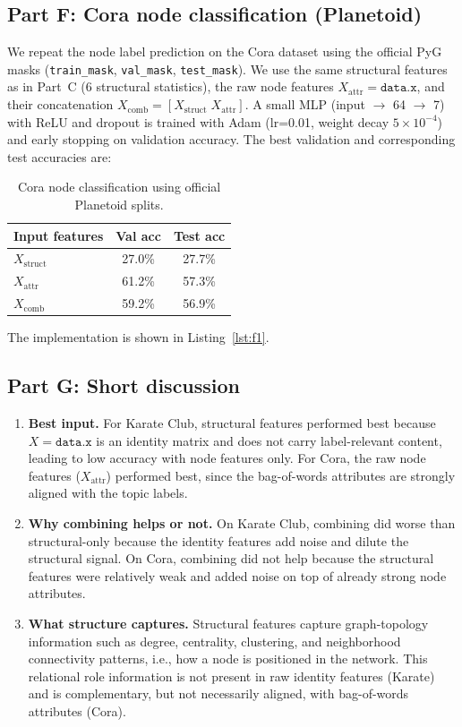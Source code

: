 \documentclass{article}
\begin{document}
\subsection{Part F: Cora node classification (Planetoid)}
We repeat the node label prediction on the Cora dataset using the official PyG masks (\texttt{train\_mask}, \texttt{val\_mask}, \texttt{test\_mask}). We use the same structural features as in Part~C (6 structural statistics), the raw node features $X_{\text{attr}}=\texttt{data.x}$, and their concatenation $X_{\text{comb}}=[X_{\text{struct}} \; X_{\text{attr}}]$. A small MLP (input $\rightarrow$ 64 $\rightarrow$ 7) with ReLU and dropout is trained with Adam (lr=0.01, weight decay $5\times10^{-4}$) and early stopping on validation accuracy. The best validation and corresponding test accuracies are:

\begin{table}[H]
    \centering
    \begin{tabular}{lcc}
        \hline
        Input features & Val acc & Test acc \\
        \hline
        $X_{\text{struct}}$ & 27.0\% & 27.7\% \\
        $X_{\text{attr}}$ & 61.2\% & 57.3\% \\
        $X_{\text{comb}}$ & 59.2\% & 56.9\% \\
        \hline
    \end{tabular}
    \caption{Cora node classification using official Planetoid splits.}
    \label{tab:cora_results}
\end{table}
The implementation is shown in Listing~\ref{lst:f1}.

\subsection{Part G: Short discussion}
\begin{enumerate}
    \item \textbf{Best input.} For Karate Club, structural features performed best because $X=\texttt{data.x}$ is an identity matrix and does not carry label-relevant content, leading to low accuracy with node features only. For Cora, the raw node features ($X_{\text{attr}}$) performed best, since the bag-of-words attributes are strongly aligned with the topic labels.
    \item \textbf{Why combining helps or not.} On Karate Club, combining did worse than structural-only because the identity features add noise and dilute the structural signal. On Cora, combining did not help because the structural features were relatively weak and added noise on top of already strong node attributes.
    \item \textbf{What structure captures.} Structural features capture graph-topology information such as degree, centrality, clustering, and neighborhood connectivity patterns, i.e., how a node is positioned in the network. This relational role information is not present in raw identity features (Karate) and is complementary, but not necessarily aligned, with bag-of-words attributes (Cora).
\end{enumerate}
\end{document}
